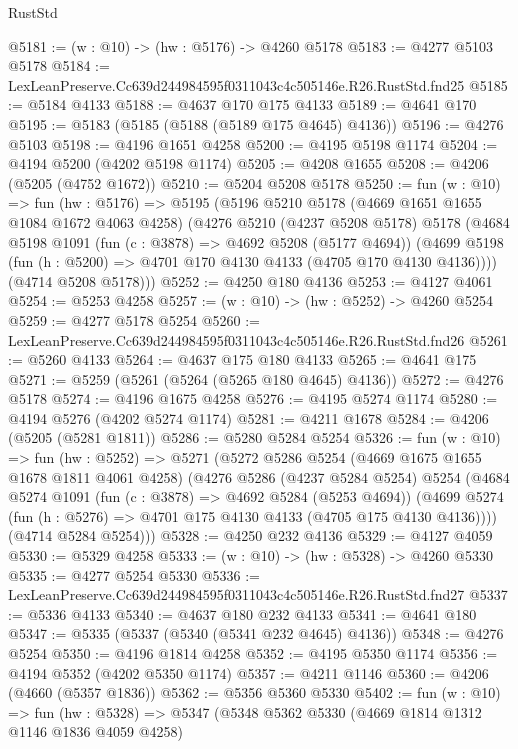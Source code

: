 \begin{lexlean}{RustStd}
\begin{coremodule}
@5181 := (w : @10) -> (hw : @5176) -> @4260 @5178
@5183 := @4277 @5103 @5178
@5184 := LexLeanPreserve.Cc639d244984595f0311043c4c505146e.R26.RustStd.fnd25
@5185 := @5184 @4133
@5188 := @4637 @170 @175 @4133
@5189 := @4641 @170
@5195 := @5183 (@5185 (@5188 (@5189 @175 @4645) @4136))
@5196 := @4276 @5103
@5198 := @4196 @1651 @4258
@5200 := @4195 @5198 @1174
@5204 := @4194 @5200 (@4202 @5198 @1174)
@5205 := @4208 @1655
@5208 := @4206 (@5205 (@4752 @1672))
@5210 := @5204 @5208 @5178
@5250 := fun (w : @10) =>
  fun (hw : @5176) =>
  @5195
    (@5196
      @5210
      @5178
      (@4669 @1651 @1655 @1084 @1672 @4063 @4258)
      (@4276
        @5210
        (@4237 @5208 @5178)
        @5178
        (@4684
          @5198
          @1091
          (fun (c : @3878) => @4692 @5208 (@5177 @4694))
          (@4699 @5198 (fun (h : @5200) => @4701 @170 @4130 @4133 (@4705 @170 @4130 @4136))))
        (@4714 @5208 @5178)))
@5252 := @4250 @180 @4136
@5253 := @4127 @4061
@5254 := @5253 @4258
@5257 := (w : @10) -> (hw : @5252) -> @4260 @5254
@5259 := @4277 @5178 @5254
@5260 := LexLeanPreserve.Cc639d244984595f0311043c4c505146e.R26.RustStd.fnd26
@5261 := @5260 @4133
@5264 := @4637 @175 @180 @4133
@5265 := @4641 @175
@5271 := @5259 (@5261 (@5264 (@5265 @180 @4645) @4136))
@5272 := @4276 @5178
@5274 := @4196 @1675 @4258
@5276 := @4195 @5274 @1174
@5280 := @4194 @5276 (@4202 @5274 @1174)
@5281 := @4211 @1678
@5284 := @4206 (@5205 (@5281 @1811))
@5286 := @5280 @5284 @5254
@5326 := fun (w : @10) =>
  fun (hw : @5252) =>
  @5271
    (@5272
      @5286
      @5254
      (@4669 @1675 @1655 @1678 @1811 @4061 @4258)
      (@4276
        @5286
        (@4237 @5284 @5254)
        @5254
        (@4684
          @5274
          @1091
          (fun (c : @3878) => @4692 @5284 (@5253 @4694))
          (@4699 @5274 (fun (h : @5276) => @4701 @175 @4130 @4133 (@4705 @175 @4130 @4136))))
        (@4714 @5284 @5254)))
@5328 := @4250 @232 @4136
@5329 := @4127 @4059
@5330 := @5329 @4258
@5333 := (w : @10) -> (hw : @5328) -> @4260 @5330
@5335 := @4277 @5254 @5330
@5336 := LexLeanPreserve.Cc639d244984595f0311043c4c505146e.R26.RustStd.fnd27
@5337 := @5336 @4133
@5340 := @4637 @180 @232 @4133
@5341 := @4641 @180
@5347 := @5335 (@5337 (@5340 (@5341 @232 @4645) @4136))
@5348 := @4276 @5254
@5350 := @4196 @1814 @4258
@5352 := @4195 @5350 @1174
@5356 := @4194 @5352 (@4202 @5350 @1174)
@5357 := @4211 @1146
@5360 := @4206 (@4660 (@5357 @1836))
@5362 := @5356 @5360 @5330
@5402 := fun (w : @10) =>
  fun (hw : @5328) =>
  @5347
    (@5348
      @5362
      @5330
      (@4669 @1814 @1312 @1146 @1836 @4059 @4258)

\end{coremodule}
\end{lexlean}
